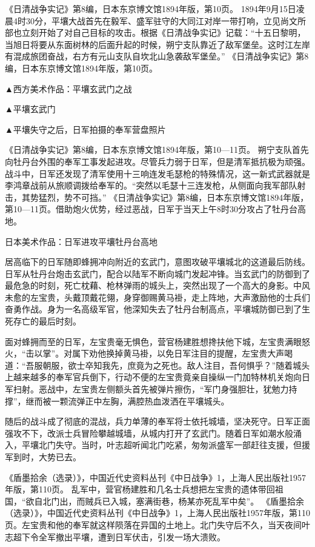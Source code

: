 \documentclass[12pt,UTF8]{ctexbook}
\begin{document}
《日清战争实记》第8编，日本东京博文馆1894年版，第10页。
1894年9月15日凌晨4时30分，平壤大战首先在毅军、盛军驻守的大同江对岸一带打响，立见尚文所部也立刻开始了对自己目标的攻击。根据《日清战争实记》记载：“十五日黎明，当旭日将要从东面树林的后面升起的时候，朔宁支队靠近了敌军堡垒。这时江左岸有混成旅团奋战，右方有元山支队自坎北山急袭敌军堡垒。” 《日清战争实记》第8编，日本东京博文馆1894年版，第10页。


▲西方美术作品：平壤玄武门之战


▲平壤玄武门


▲平壤失守之后，日军拍摄的奉军营盘照片

《日清战争实记》第8编，日本东京博文馆1894年版，第10—11页。
朔宁支队首先向牡丹台外围的奉军工事发起进攻。尽管兵力弱于日军，但是清军抵抗极为顽强。战斗中，日军还发现了清军使用十三响连发毛瑟枪的特殊情况，这一新式武器就是李鸿章战前从旅顺调拨给奉军的。“突然以毛瑟十三连发枪，从侧面向我军部队射击，其势猛烈，势不可挡。” 《日清战争实记》第8编，日本东京博文馆1894年版，第10—11页。借助炮火优势，经过恶战，日军于当天上午8时30分攻占了牡丹台高地。


日本美术作品：日军进攻平壤牡丹台高地

居高临下的日军随即蜂拥冲向附近的玄武门，意图攻破平壤城北的这道最后防线。日军从牡丹台炮击玄武门，配合以陆军不断向城门发起冲锋。当玄武门的防御到了最危急的时刻，死亡枕藉、枪林弹雨的城头上，突然出现了一个高大的身影。中风未愈的左宝贵，头戴顶戴花翎，身穿御赐黄马褂，走上阵地，大声激励他的士兵们奋勇作战。身为一名高级军官，他深知失去了牡丹台制高点，平壤城防御已到了生死存亡的最后时刻。

面对蜂拥而至的日军，左宝贵毫无惧色，营官杨建胜想搀扶他下城，左宝贵满眼怒火，“击以掌”。对属下劝他换掉黄马褂，以免日军注目的提醒，左宝贵大声喝道：“吾服朝服，欲士卒知我先，庶竟为之死也。敌人注目，吾何惧乎？”随着城头上越来越多的奉军官兵倒下，行动不便的左宝贵竟亲自操纵一门加特林机关炮向日军扫射。恶战中，左宝贵左侧额头首先被弹片擦伤，“军门身强胆壮，犹勉力持撑”，继而被一颗流弹正中左胸，满腔热血泼洒在平壤城头。

随后的战斗成了彻底的混战，兵力单薄的奉军将士依托城墙，坚决死守。日军正面强攻不下，改派士兵冒险攀越城墙，从城内打开了玄武门。随着日军如潮水般涌入，平壤北门失守。当时，叶志超听闻北门吃紧，匆匆派盛军一部赶往支援，但援军到时，大势已去。

《盾墨拾余（选录）》，中国近代史资料丛刊《中日战争》1，上海人民出版社1957年版，第110页。
乱军中，营官杨建胜和几名士兵想把左宝贵的遗体带回祖国，“欲自北门出，而贼兵已入城，塞满街巷，杨某亦死乱军中矣”。 《盾墨拾余（选录）》，中国近代史资料丛刊《中日战争》1，上海人民出版社1957年版，第110页。左宝贵和他的奉军就这样陨落在异国的土地上。北门失守后不久，当天夜间叶志超下令全军撤出平壤，遭到日军伏击，引发一场大溃败。
\end{document}
